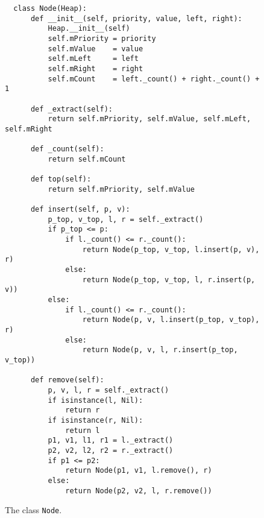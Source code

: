 \begin{figure}[!ht]
\centering
\begin{verbatim}
  class Node(Heap):
      def __init__(self, priority, value, left, right):
          Heap.__init__(self)
          self.mPriority = priority
          self.mValue    = value
          self.mLeft     = left
          self.mRight    = right
          self.mCount    = left._count() + right._count() + 1
          
      def _extract(self):
          return self.mPriority, self.mValue, self.mLeft, self.mRight
      
      def _count(self):
          return self.mCount
      
      def top(self):
          return self.mPriority, self.mValue
  
      def insert(self, p, v):
          p_top, v_top, l, r = self._extract()
          if p_top <= p:
              if l._count() <= r._count():
                  return Node(p_top, v_top, l.insert(p, v), r)
              else:
                  return Node(p_top, v_top, l, r.insert(p, v))
          else:
              if l._count() <= r._count():
                  return Node(p, v, l.insert(p_top, v_top), r)
              else:
                  return Node(p, v, l, r.insert(p_top, v_top))    
  
      def remove(self):
          p, v, l, r = self._extract()
          if isinstance(l, Nil):
              return r
          if isinstance(r, Nil):
              return l
          p1, v1, l1, r1 = l._extract()
          p2, v2, l2, r2 = r._extract()
          if p1 <= p2:
              return Node(p1, v1, l.remove(), r)
          else:
              return Node(p2, v2, l, r.remove())
\end{verbatim}
\vspace*{-0.3cm}
\caption{The class \texttt{Node}.}
\label{fig:Heap.ipynb:Node}
\end{figure}


